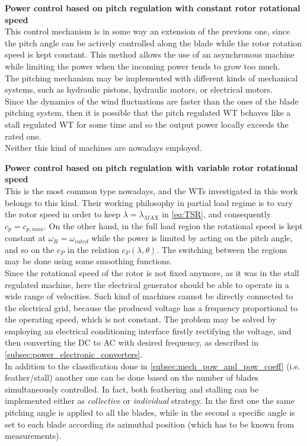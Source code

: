 \textbf{Power control based on pitch regulation with constant rotor rotational speed}\\
This control mechanism is in some way an extension of the previous one, since the pitch angle can be actively controlled along the blade while the rotor rotation speed is kept constant. This method allows the use of an asynchronous machine while limiting the power when the incoming power tends to grow too much. \\
 The pitching mechanism may be implemented with different kinds of mechanical systems, such as hydraulic pistons, hydraulic motors, or electrical motors. \\
Since the dynamics of the wind fluctuations are faster than the ones of the blade pitching system, then it is possible that the pitch regulated WT behaves like a stall regulated \acrshort{WT} for some time and so the output power locally exceeds the rated one.\\
Neither this kind of machines are nowadays employed.

\textbf{Power control based on pitch regulation with variable rotor rotational speed}\\
This is the most common type nowadays, and the \acrshort{WTs} investigated in this work belongs to this kind. Their working philosophy in partial load regime is to vary the rotor speed in order to keep $\lambda = \lambda_{MAX}$ in \autoref{eq:TSR}, and consequently $c_p=c_{p,max}$. On the other hand, in the full load region the rotational speed is kept constant at $\omega_R = \omega_{rated}$ while the power is limited by acting on the pitch angle, and so on the $c_P$ in the relation $c_P(\lambda, \theta)$. The switching between the regions may be done using some smoothing functions. \\
Since the rotational speed of the rotor is not fixed anymore, as it was in the stall regulated machine, here the electrical generator should be able to operate in a wide range of velocities. Such kind of machines cannot be directly connected to the electrical grid, because the produced voltage has a frequency proportional to the operating speed, which is not constant. The problem may be solved by employing an electrical conditioning interface firstly rectifying the voltage, and then converting the DC to AC with desired frequency, as described in \autoref{subsec:power_electronic_converters}. \\
In addition to the classification done in \ref{subsec:mech_pow_and_pow_coeff} (i.e. feather/stall) another one can be done based on the number of blades simultaneously controlled. In fact, both feathering and stalling can be implemented either as \textit{collective} or \textit{individual} strategy. In the first one the same pitching angle is applied to all the blades, while in the second a specific angle is set to each blade according its azimuthal position (which has to be known from measurements).

